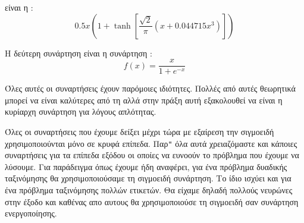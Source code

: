 είναι η :
$$0.5x\left(1+\tanh \left[\frac{\sqrt{2}}{\pi}(x+0.044715x^3)\right]\right)$$
\begin{figure}[H]
    \centering
    \caption{}
\end{figure}
Η δεύτερη συνάρτηση είναι η συνάρτηση :
$$f(x)=\frac{x}{1+e^{-x}}$$
\begin{figure}[H]
    \centering
    \caption{}
\end{figure}
Όλες αυτές οι συναρτήσεις έχουν παρόμοιες ιδιότητες. Πολλές από αυτές θεωρητικά μπορεί να είναι καλύτερες από τη  αλλά στην πράξη αυτή εξακολουθεί να είναι η κυρίαρχη συνάρτηση για λόγους απλότητας.

Όλες οι συναρτήσεις που έχουμε δείξει μέχρι τώρα με εξαίρεση την σιγμοειδή χρησιμοποιούνται μόνο σε κρυφά επίπεδα. Παρ\texttt{"} όλα αυτά χρειαζόμαστε και κάποιες συναρτήσεις για τα επίπεδα εξόδου οι οποίες να ευνοούν το πρόβλημα που έχουμε να
λύσουμε. Για παράδειγμα όπως έχουμε ήδη αναφέρει, για ένα πρόβλημα δυαδικής ταξινόμησης θα χρησιμοποιούσαμε τη σιγμοειδή συνάρτηση. Το ίδιο ισχύει και για ένα πρόβλημα ταξινόμησης πολλών ετικετών. Θα είχαμε δηλαδή πολλούς νευρώνες στην
έξοδο και καθένας απο αυτους θα χρησιμοποιούσε τη σιγμοειδή σαν συνάρτηση ενεργοποίησης.

